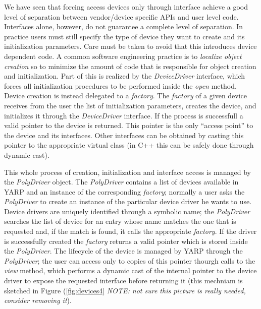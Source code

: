We have seen that forcing access devices only through 
interface achieve a good level of separation between vendor/device specific APIs and 
user level code. Interfaces alone, however, do not guarantee a complete level of 
separation. In practice users must still specify the type of device they 
want to create and its initialization parameters. Care must be taken to avoid that 
this introduces device dependent code. A common software engineering practice is to 
\emph{localize object creation} so to minimize the amount of code that is responsible
for object creation and initialization. Part of this is realized by the 
\emph{DeviceDriver} interface, which forces all initialization procedures to be 
performed inside the \emph{open} method. Device creation is instead delegated to 
a \emph{factory}. The \emph{factory} of a given device receives from the user 
the list of initialization parameters, creates the device, and initializes it 
through the \emph{DeviceDriver} interface. If the process is successfull 
a valid pointer to the device is returned. This pointer is the only 
``access point'' to the device and its interfaces. Other interfaces can be 
obtained by casting this pointer to the appropriate virtual class (in C++ this 
can be safely done through dynamic cast). 

This whole process of creation, initialization and interface access is managed
by the  \emph{PolyDriver} object. The \emph{PolyDriver} contains a list of devices 
available in YARP and an instance of the corresponding \emph{factory}; normally a
user asks the \emph{PolyDriver} to create an instance of the particular device driver
he wants to use. Device drivers are uniquely identified through a symbolic name; 
the \emph{PolyDriver} searches the list of device for an entry whose name matches the 
one that is requested and, if the match is found, it calls the appropriate 
\emph{factory}. If the driver is successfully created the \emph{factory} returns 
a valid pointer which is stored inside the \emph{PolyDriver}. The lifecycle of the 
device is managed by YARP through the \emph{PolyDriver}; the user can access only to 
copies of 
this pointer thourgh calls to the \emph{view} method, which performs 
a dynamic cast of the internal pointer to the device driver to expose the requested
interface before returning it (this mechniam is sketched in Figure 
(\ref{fig:devices4} \emph{NOTE: not sure this picture is really needed, 
consider removing it}).

